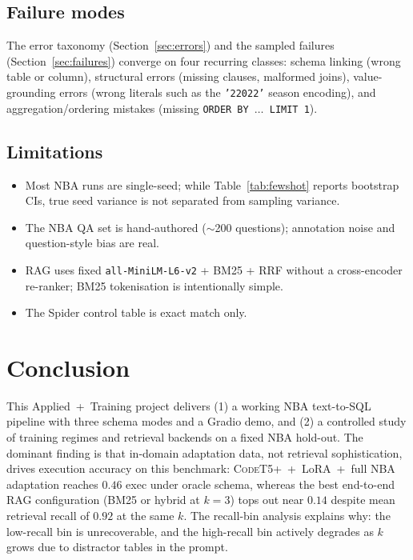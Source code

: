 \documentclass[11pt,a4paper]{article}
\newcommand{\codet}{\textsc{CodeT5+}}
\begin{document}
\subsection{Failure modes}
The error taxonomy (Section~\ref{sec:errors}) and the sampled failures
(Section~\ref{sec:failures}) converge on four recurring classes:
schema linking (wrong table or column), structural errors (missing clauses,
malformed joins), value-grounding errors (wrong literals such as the
\texttt{'22022'} season encoding), and aggregation/ordering mistakes
(missing \texttt{ORDER BY $\dots$ LIMIT 1}).

\subsection{Limitations}
\begin{itemize}[leftmargin=*,itemsep=2pt]
\item Most NBA runs are single-seed; while Table~\ref{tab:fewshot} reports
      bootstrap CIs, true seed variance is not separated from sampling
      variance.
\item The NBA QA set is hand-authored ($\sim$200 questions); annotation noise
      and question-style bias are real.
\item RAG uses fixed \texttt{all-MiniLM-L6-v2} + BM25 + RRF without a
      cross-encoder re-ranker; BM25 tokenisation is intentionally simple.
\item The Spider control table is exact match only.
\end{itemize}

\section{Conclusion}
\label{sec:conclusion}

This Applied~+~Training project delivers (1) a working NBA text-to-SQL
pipeline with three schema modes and a Gradio demo, and (2) a controlled
study of training regimes and retrieval backends on a fixed NBA hold-out.
The dominant finding is that in-domain adaptation data, not retrieval
sophistication, drives execution accuracy on this benchmark:
\codet{}~+~LoRA~+~full NBA adaptation reaches $0.46$ exec under oracle
schema, whereas the best end-to-end RAG configuration (BM25 or hybrid at
$k{=}3$) tops out near $0.14$ despite mean retrieval recall of $0.92$ at the
same $k$. The recall-bin analysis explains why: the low-recall bin is
unrecoverable, and the high-recall bin actively degrades as $k$ grows due to
distractor tables in the prompt.
\end{document}

